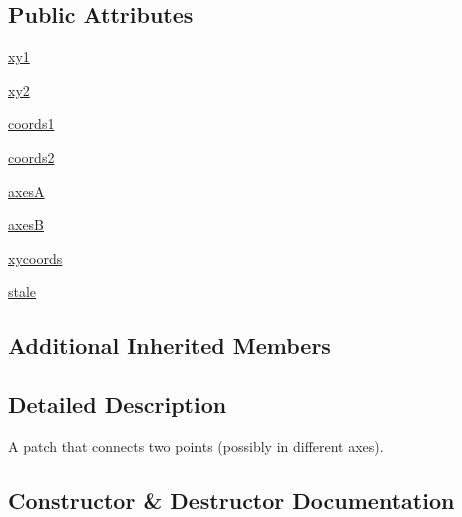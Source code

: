 \subsection*{Public Attributes}
\begin{DoxyCompactItemize}
\item 
\hyperlink{classmatplotlib_1_1patches_1_1ConnectionPatch_ac503ef329ac677ef1528a65467a591bb}{xy1}
\item 
\hyperlink{classmatplotlib_1_1patches_1_1ConnectionPatch_a2536157c06b2e05e15452486d2f0032d}{xy2}
\item 
\hyperlink{classmatplotlib_1_1patches_1_1ConnectionPatch_a52af5ed23663d44e3127ffa1630a9645}{coords1}
\item 
\hyperlink{classmatplotlib_1_1patches_1_1ConnectionPatch_a7841906c2a4072edb349d3d350df9444}{coords2}
\item 
\hyperlink{classmatplotlib_1_1patches_1_1ConnectionPatch_a5943bba0396030581a92ed5f92fcf5ff}{axesA}
\item 
\hyperlink{classmatplotlib_1_1patches_1_1ConnectionPatch_a7c33301ad97b65e7bdc1cad339ff071f}{axesB}
\item 
\hyperlink{classmatplotlib_1_1patches_1_1ConnectionPatch_a2945bc361aa238ef005c6cc9e651e76c}{xycoords}
\item 
\hyperlink{classmatplotlib_1_1patches_1_1ConnectionPatch_a3f9f9a7c8c8dbc3416b34be8f3623e33}{stale}
\end{DoxyCompactItemize}
\subsection*{Additional Inherited Members}


\subsection{Detailed Description}
\begin{DoxyVerb}A patch that connects two points (possibly in different axes).\end{DoxyVerb}
 

\subsection{Constructor \& Destructor Documentation}
\mbox{\label{classmatplotlib_1_1patches_1_1ConnectionPatch_a6f4e5dce65fbbb4796e7a4d33cdf638d}} 
